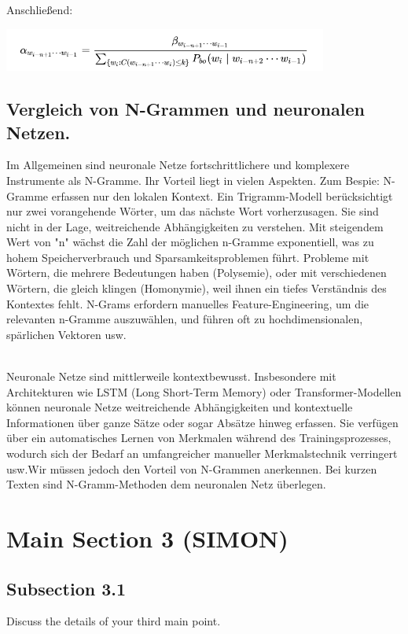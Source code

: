\documentclass[12pt]{article}
\begin{document}
Anschließend:

\begin{center}
	\includegraphics[width=0.8\textwidth]{statics/Borisov/11.PNG}
\end{center}

\subsection{Vergleich von N-Grammen und neuronalen Netzen.}
\quad Im Allgemeinen sind neuronale Netze fortschrittlichere und komplexere Instrumente als N-Gramme. Ihr Vorteil liegt in vielen Aspekten. Zum Bespie: N-Gramme erfassen nur den lokalen Kontext. Ein Trigramm-Modell berücksichtigt nur zwei vorangehende Wörter, um das nächste Wort vorherzusagen. Sie sind nicht in der Lage, weitreichende Abhängigkeiten zu verstehen. Mit steigendem Wert von "n" wächst die Zahl der möglichen n-Gramme exponentiell, was zu hohem Speicherverbrauch und Sparsamkeitsproblemen führt. Probleme mit Wörtern, die mehrere Bedeutungen haben (Polysemie), oder mit verschiedenen Wörtern, die gleich klingen (Homonymie), weil ihnen ein tiefes Verständnis des Kontextes fehlt. N-Grams erfordern manuelles Feature-Engineering, um die relevanten n-Gramme auszuwählen, und führen oft zu hochdimensionalen, spärlichen Vektoren usw.

\cite{roshmita2023}
\cite{clarkGiorgoloLappin}
\\
Neuronale Netze sind mittlerweile kontextbewusst. Insbesondere mit Architekturen wie LSTM (Long Short-Term Memory) oder Transformer-Modellen können neuronale Netze weitreichende Abhängigkeiten und kontextuelle Informationen über ganze Sätze oder sogar Absätze hinweg erfassen. Sie verfügen über ein automatisches Lernen von Merkmalen während des Trainingsprozesses, wodurch sich der Bedarf an umfangreicher manueller Merkmalstechnik verringert usw.Wir müssen jedoch den Vorteil von N-Grammen anerkennen. Bei kurzen Texten sind N-Gramm-Methoden dem neuronalen Netz überlegen.
\cite{babukumar2010}

\section{Main Section 3 (SIMON)}
\subsection{Subsection 3.1}
Discuss the details of your third main point.
\end{document}

